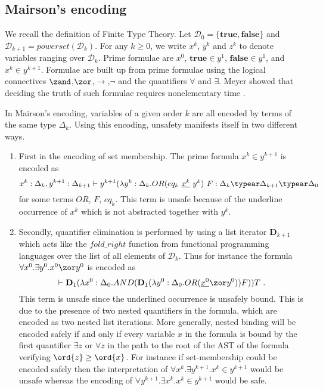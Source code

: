 \subsection{Mairson's encoding}
We recall the definition of Finite Type Theory. Let $\mathcal{D}_0 = \{\mathbf{true},\mathbf{false}\}$ and $\mathcal{D}_{k+1} =powerset(\mathcal{D}_k)$.
For any $k\geq0$, we write $x^k$, $y^k$ and $z^k$ to denote variables ranging over $\mathcal{D}_k$. Prime formulae are $x^0$, $\mathbf{true}\in y^1$, $\mathbf{false}\in y^1$, and  $x^k \in y^{k+1}$. Formulae are built up from prime formulae using the logical connectives $\zand$,$\zor$,$\rightarrow$,$\neg$ and the quantifiers
$\forall$ and $\exists$. Meyer showed that deciding the truth of such formulae requires nonelementary time \cite{Meyer1974}.
\smallskip

In Mairson's encoding, variables of a given order $k$ are all encoded by terms of the same type $\Delta_k$. Using this encoding,
unsafety manifests itself in two different ways.
\begin{enumerate}[1.]
  \item
        First in the encoding of set membership. The prime formula $x^k \in y^{k+1}$ is encoded as \begin{equation} x^k : \Delta_k, y^{k+1}:\Delta_{k+1} \vdash y^{k+1} (\lambda y^k : \Delta_k . OR (eq_k~\underline{x^k}~y^k)~F : \Delta_k \typear \Delta_{k+1} \typear \Delta_0 \label{eqn:setmembership}\end{equation}
for some terms $OR$, $F$, $eq_k$.
This term is unsafe because of the underline occurrence of $x^k$ which is not abstracted together with $y^k$.

\item Secondly, quantifier elimination is performed by using a list iterator $\mathbf{D}_{k+1}$ which acts like the $fold\_right$ function from functional programming languages over the list of all elements of $\mathcal{D}_k$.
Thus for instance the formula $\forall x^0 . \exists y^0 . x^0 \zor y^0$
is encoded as $$\vdash \mathbf{D}_1 (\lambda x^0:\Delta_0. AND (\mathbf{D}_1 (\lambda y^0:\Delta_0. OR (\underline{x^0} \zor y^0)) F)) T \ .$$
This term is unsafe since the underlined occurrence is unsafely bound. This is due to the presence of two nested quantifiers in the formula, which are encoded as two nested list iterations. More generally, nested binding will be encoded safely if and only if every variable $x$ in the formula is bound by the first quantifier $\exists z$ or $\forall z$ in the path to the root of the AST of the formula verifying $\ord{z} \geq \ord{x}$. For instance if set-membership could be encoded safely then the interpretation of $\forall x^k . \exists y^{k+1} . x^k \in y^{k+1}$ would be unsafe whereas the encoding of $\forall y^{k+1} . \exists x^k . x^k \in y^{k+1}$ would be safe.
\end{enumerate}

